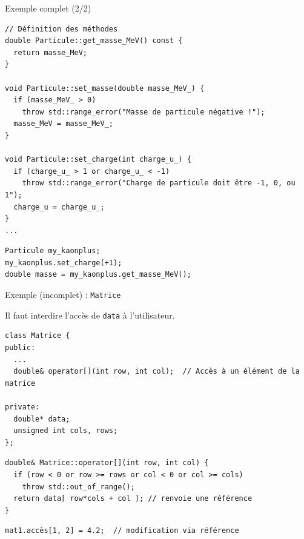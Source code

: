 \documentclass[c]{beamer}
\begin{document}

\begin{frame}[fragile]{Exemple complet (2/2)}

\begin{verbatim}
// Définition des méthodes
double Particule::get_masse_MeV() const {
  return masse_MeV;
}

void Particule::set_masse(double masse_MeV_) {
  if (masse_MeV_ > 0)
    throw std::range_error("Masse de particule négative !");
  masse_MeV = masse_MeV_;
}

void Particule::set_charge(int charge_u_) {
  if (charge_u_ > 1 or charge_u_ < -1)
    throw std::range_error("Charge de particule doit être -1, 0, ou 1");
  charge_u = charge_u_;
}
...
\end{verbatim}
\pause
\begin{verbatim}
Particule my_kaonplus;
my_kaonplus.set_charge(+1);
double masse = my_kaonplus.get_masse_MeV();
\end{verbatim}

\end{frame}


\begin{frame}[fragile]{Exemple (incomplet) : \texttt{Matrice}}

Il faut interdire l'accès de \texttt{data} à l'utilisateur.
\vspace{1em}
\begin{verbatim}
class Matrice {
public:
  ...
  double& operator[](int row, int col);  // Accès à un élément de la matrice

private:
  double* data;
  unsigned int cols, rows;
};
\end{verbatim}
\pause
\vspace{1em}
\begin{verbatim}
double& Matrice::operator[](int row, int col) {
  if (row < 0 or row >= rows or col < 0 or col >= cols)
    throw std::out_of_range();
  return data[ row*cols + col ]; // renvoie une référence
}
\end{verbatim}
\pause
\vspace{1em}
\begin{verbatim}
mat1.accès[1, 2] = 4.2;  // modification via référence
\end{verbatim}

\end{frame}
\end{document}
